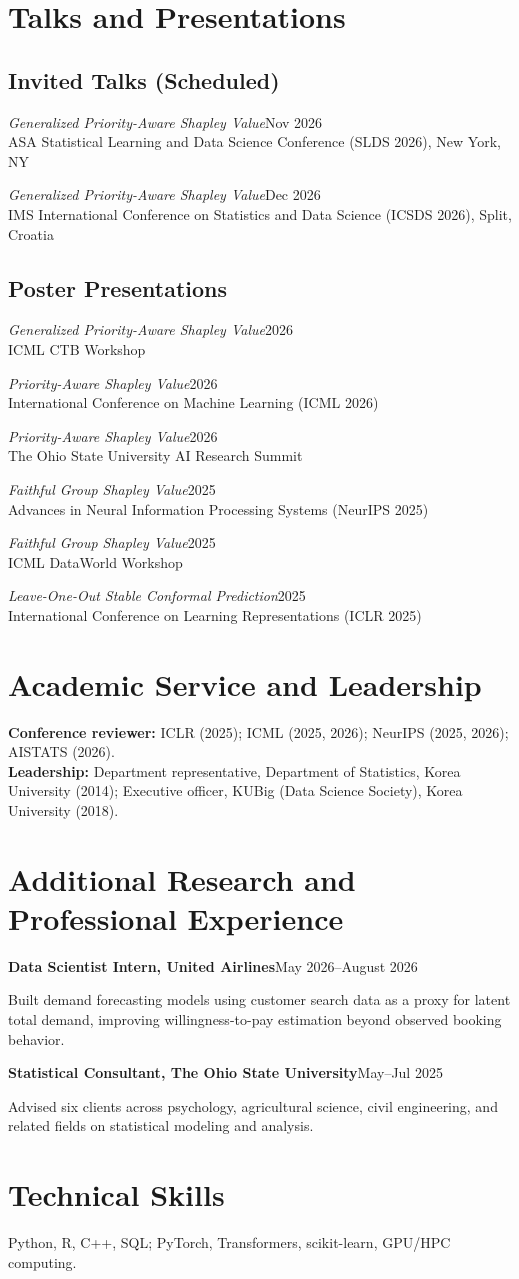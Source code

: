 \documentclass[letterpaper,11pt]{article}
\newcommand{\lineentry}[2]{%
  \textbf{#1}\hfill {\color{muted}#2}\par\vspace{2pt}
}
\newcommand{\presentation}[3]{%
  \emph{#1}\hfill {\color{muted}#3}\\[-1pt]
  #2\par\vspace{2pt}
}
\begin{document}
\section{Talks and Presentations}
\subsection{Invited Talks (Scheduled)}
\presentation{Generalized Priority-Aware Shapley Value}{ASA Statistical Learning and Data Science Conference (SLDS 2026), New York, NY}{Nov 2026}
\presentation{Generalized Priority-Aware Shapley Value}{IMS International Conference on Statistics and Data Science (ICSDS 2026), Split, Croatia}{Dec 2026}

\subsection{Poster Presentations}
\presentation{Generalized Priority-Aware Shapley Value}{ICML CTB Workshop}{2026}
\presentation{Priority-Aware Shapley Value}{International Conference on Machine Learning (ICML 2026)}{2026}
\presentation{Priority-Aware Shapley Value}{The Ohio State University AI Research Summit}{2026}
\presentation{Faithful Group Shapley Value}{Advances in Neural Information Processing Systems (NeurIPS 2025)}{2025}
\presentation{Faithful Group Shapley Value}{ICML DataWorld Workshop}{2025}
\presentation{Leave-One-Out Stable Conformal Prediction}{International Conference on Learning Representations (ICLR 2025)}{2025}

\section{Academic Service and Leadership}
\textbf{Conference reviewer:} ICLR (2025); ICML (2025, 2026); NeurIPS (2025, 2026); AISTATS (2026).\\[3pt]
\textbf{Leadership:} Department representative, Department of Statistics, Korea University (2014); Executive officer, KUBig (Data Science Society), Korea University (2018).

\section{Additional Research and Professional Experience}
\lineentry{Data Scientist Intern, United Airlines}{May 2026--August 2026}
Built demand forecasting models using customer search data as a proxy for latent total demand, improving willingness-to-pay estimation beyond observed booking behavior.\par\vspace{5pt}
\lineentry{Statistical Consultant, The Ohio State University}{May--Jul 2025}
Advised six clients across psychology, agricultural science, civil engineering, and related fields on statistical modeling and analysis.

\section{Technical Skills}
Python, R, C++, SQL; PyTorch, Transformers, scikit-learn, GPU/HPC computing.
\end{document}
